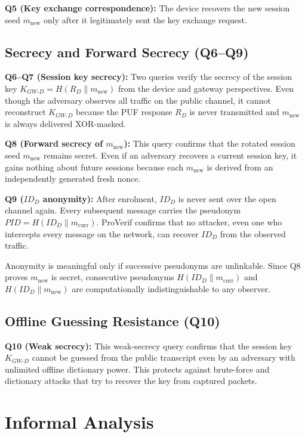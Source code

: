 \textbf{Q5 (Key exchange correspondence):}
The device recovers the new session seed $m_{\mathrm{new}}$ only after it
legitimately sent the key exchange request.

\subsection{Secrecy and Forward Secrecy (Q6--Q9)}

\textbf{Q6--Q7 (Session key secrecy):}
Two queries verify the secrecy of the session key
$K_{GW\text{-}D} = H(R_D \| m_{\mathrm{new}})$ from the device and gateway
perspectives.
Even though the adversary observes all traffic on the public channel, it cannot
reconstruct $K_{GW\text{-}D}$ because the PUF response $R_D$ is never transmitted
and $m_{\mathrm{new}}$ is always delivered XOR-masked.

\textbf{Q8 (Forward secrecy of $m_{\mathrm{new}}$):}
This query confirms that the rotated session seed $m_{\mathrm{new}}$ remains secret.
Even if an adversary recovers a current session key, it gains nothing about future
sessions because each $m_{\mathrm{new}}$ is derived from an independently generated
fresh nonce.

\textbf{Q9 ($ID_D$ anonymity):}
After enrolment, $ID_D$ is never sent over the open channel again.
Every subsequent message carries the pseudonym
$\mathit{PID} = H(ID_D \| m_{\mathrm{curr}})$.
ProVerif confirms that no attacker, even one who intercepts every message on the
network, can recover $ID_D$ from the observed traffic.

Anonymity is meaningful only if successive pseudonyms are unlinkable.
Since Q8 proves $m_{\mathrm{new}}$ is secret, consecutive pseudonyms
$H(ID_D \| m_{\mathrm{curr}})$ and $H(ID_D \| m_{\mathrm{new}})$ are
computationally indistinguishable to any observer.

\subsection{Offline Guessing Resistance (Q10)}

\textbf{Q10 (Weak secrecy):}
This weak-secrecy query confirms that the session key $K_{GW\text{-}D}$ cannot
be guessed from the public transcript even by an adversary with unlimited offline
dictionary power.
This protects against brute-force and dictionary attacks that try to recover the
key from captured packets.

\section{Informal Analysis}

